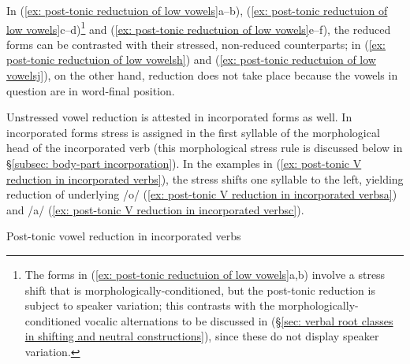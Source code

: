 In (\ref{ex: post-tonic reductuion of low vowels}a--b), (\ref{ex: post-tonic reductuion of low vowels}c--d)\footnote{The forms in (\ref{ex: post-tonic reductuion of low vowels}a,b) involve a stress shift that is morphologically-conditioned, but the post-tonic reduction is subject to speaker variation; this contrasts with the morphologically-conditioned vocalic alternations to be discussed in  (§\ref{sec: verbal root classes in shifting and neutral constructions}), since these do not display speaker variation.}  and (\ref{ex: post-tonic reductuion of low vowels}e--f), the reduced forms can be contrasted with their stressed, non-reduced counterparts;  in (\ref{ex: post-tonic reductuion of low vowelsh}) and (\ref{ex: post-tonic reductuion of low vowelsj}), on the other hand, reduction does not take place because the vowels in question are in word-final position.

Unstressed vowel reduction is attested in incorporated forms as well. In incorporated forms stress is assigned in the first syllable of the morphological head of the incorporated verb (this morphological stress rule is discussed below in §\ref{subsec: body-part incorporation}). In the examples in (\ref{ex: post-tonic V reduction in incorporated verbs}), the stress shifts one syllable to the left, yielding reduction of underlying /o/ (\ref{ex: post-tonic V reduction in incorporated verbsa}) and /a/ (\ref{ex: post-tonic V reduction in incorporated verbsc}).

\ea\label{ex: post-tonic V reduction in incorporated verbs}
{Post-tonic vowel reduction in incorporated verbs}

